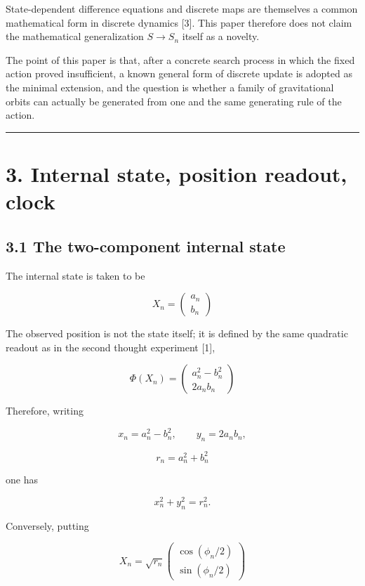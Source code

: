 \documentclass[
  a4paper,
]{article}
\begin{document}
State-dependent difference equations and discrete maps are themselves a
common mathematical form in discrete dynamics {[}3{]}. This paper
therefore does not claim the mathematical generalization
\(S\rightarrow S_n\) itself as a novelty.

The point of this paper is that, after a concrete search process in
which the fixed action proved insufficient, a known general form of
discrete update is adopted as the minimal extension, and the question is
whether a family of gravitational orbits can actually be generated from
one and the same generating rule of the action.

\begin{center}\rule{0.5\linewidth}{0.5pt}\end{center}

\section{3. Internal state, position readout,
clock}\label{internal-state-position-readout-clock}

\subsection{3.1 The two-component internal
state}\label{the-two-component-internal-state}

The internal state is taken to be

\[
X_n=
\begin{pmatrix}
a_n\\
b_n
\end{pmatrix}
\]

The observed position is not the state itself; it is defined by the same
quadratic readout as in the second thought experiment {[}1{]},

\[
\Phi(X_n)
=
\begin{pmatrix}
a_n^2-b_n^2\\
2a_nb_n
\end{pmatrix}
\]

Therefore, writing

\[
x_n=a_n^2-b_n^2,
\qquad
y_n=2a_nb_n,
\]

\[
r_n=a_n^2+b_n^2
\]

one has

\[
x_n^2+y_n^2=r_n^2.
\]

Conversely, putting

\[
X_n=
\sqrt{r_n}
\begin{pmatrix}
\cos(\phi_n/2)\\
\sin(\phi_n/2)
\end{pmatrix}
\]
\end{document}
